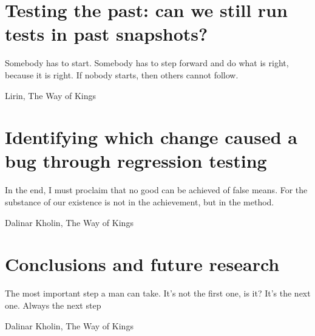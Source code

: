 \documentclass[11pt,a4paper,twoside]{book}
\begin{document}
\chapter{Testing the past: can we still run tests in past snapshots?}
\begin{FraseCelebre}
    \begin{Frase}
        Somebody has to start. Somebody has to step forward and do what is right, because it is right. If nobody starts, then others cannot follow.
    \end{Frase}
    \begin{Fuente}
        Lirin, The Way of Kings
    \end{Fuente}
\end{FraseCelebre}
\label{chapter:testability}


\chapter{Identifying which change caused a bug through regression testing}
\begin{FraseCelebre}
    \begin{Frase}
        In the end, I must proclaim that no good can be achieved of false means. For the substance of our existence is not in the achievement, but in the method.
    \end{Frase}
    \begin{Fuente}
        Dalinar Kholin, The Way of Kings
    \end{Fuente}
\end{FraseCelebre}
\label{chapter:bug-hunter}


\chapter{Conclusions and future research}
\begin{FraseCelebre}
    \begin{Frase}
        The most important step a man can take. It's not the first one, is it? It's the next one. Always the next step
    \end{Frase}
    \begin{Fuente}
        Dalinar Kholin, The Way of Kings
    \end{Fuente}
\end{FraseCelebre}
\label{chapter:conclusions}


% 

\backmatter

%
%



\end{document}
